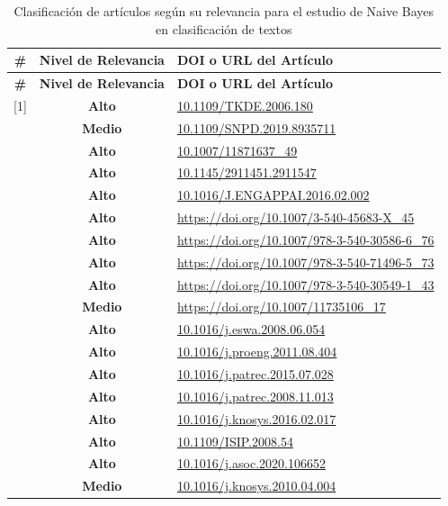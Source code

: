 \begin{longtable}{|c|c|p{9cm}|}
\caption{Clasificación de artículos según su relevancia para el estudio de Naive Bayes en clasificación de textos}
\label{tab:clasificacion-articulos} \\
\hline
\textbf{\#} & \textbf{Nivel de Relevancia} & \textbf{DOI o URL del Artículo} \\
\hline
\endfirsthead

\hline
\textbf{\#} & \textbf{Nivel de Relevancia} & \textbf{DOI o URL del Artículo} \\
\hline
\endhead

[1]  & \textbf{Alto}  & \url{10.1109/TKDE.2006.180} \\
\hline
[2]  & \textbf{Medio} & \url{10.1109/SNPD.2019.8935711} \\
\hline
[3]  & \textbf{Alto}  & \url{10.1007/11871637_49} \\
\hline
[4]  & \textbf{Alto}  & \url{10.1145/2911451.2911547} \\
\hline
[5]  & \textbf{Alto}  & \url{10.1016/J.ENGAPPAI.2016.02.002} \\
\hline
[6]  & \textbf{Alto}  & \url{https://doi.org/10.1007/3-540-45683-X_45} \\
\hline
[7]  & \textbf{Alto}  & \url{https://doi.org/10.1007/978-3-540-30586-6_76} \\
\hline
[8]  & \textbf{Alto}  & \url{https://doi.org/10.1007/978-3-540-71496-5_73} \\
\hline
[9]  & \textbf{Alto}  & \url{https://doi.org/10.1007/978-3-540-30549-1_43} \\
\hline
[10] & \textbf{Medio} & \url{https://doi.org/10.1007/11735106_17} \\
\hline
[11] & \textbf{Alto}  & \url{10.1016/j.eswa.2008.06.054} \\
\hline
[12] & \textbf{Alto}  & \url{10.1016/j.proeng.2011.08.404} \\
\hline
[13] & \textbf{Alto}  & \url{10.1016/j.patrec.2015.07.028} \\
\hline
[14] & \textbf{Alto}  & \url{10.1016/j.patrec.2008.11.013} \\
\hline
[15] & \textbf{Alto}  & \url{10.1016/j.knosys.2016.02.017} \\
\hline
[16] & \textbf{Alto}  & \url{10.1109/ISIP.2008.54} \\
\hline
[17] & \textbf{Alto}  & \url{10.1016/j.asoc.2020.106652} \\
\hline
[18] & \textbf{Medio} & \url{10.1016/j.knosys.2010.04.004} \\

\end{longtable}

